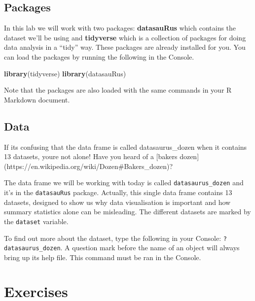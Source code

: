 \documentclass[
]{article}
\newenvironment{Shaded}{\begin{snugshade}}{\end{snugshade}}
\newcommand{\FunctionTok}[1]{\textcolor[rgb]{0.13,0.29,0.53}{\textbf{#1}}}
\newcommand{\NormalTok}[1]{#1}
\begin{document}
\subsection{Packages}\label{packages}

In this lab we will work with two packages: \textbf{datasauRus} which
contains the dataset we'll be using and \textbf{tidyverse} which is a
collection of packages for doing data analysis in a ``tidy'' way. These
packages are already installed for you. You can load the packages by
running the following in the Console.

\begin{Shaded}
\begin{Highlighting}[]
\FunctionTok{library}\NormalTok{(tidyverse) }
\FunctionTok{library}\NormalTok{(datasauRus)}
\end{Highlighting}
\end{Shaded}

Note that the packages are also loaded with the same commands in your R
Markdown document.

\subsection{Data}\label{data}

\begin{Shaded}
\begin{Highlighting}[]
\NormalTok{If it\textquotesingle{}s confusing that the data frame is called \textasciigrave{}datasaurus\_dozen\textasciigrave{} when it contains 13 datasets, you\textquotesingle{}re not alone! Have you heard of a [baker\textquotesingle{}s dozen](https://en.wikipedia.org/wiki/Dozen\#Baker\textquotesingle{}s\_dozen)?}
\end{Highlighting}
\end{Shaded}

The data frame we will be working with today is called
\texttt{datasaurus\_dozen} and it's in the \texttt{datasauRus} package.
Actually, this single data frame contains 13 datasets, designed to show
us why data visualisation is important and how summary statistics alone
can be misleading. The different datasets are marked by the
\texttt{dataset} variable.

To find out more about the dataset, type the following in your Console:
\texttt{?datasaurus\_dozen}. A question mark before the name of an
object will always bring up its help file. This command must be ran in
the Console.

\section{Exercises}\label{exercises}
\end{document}
